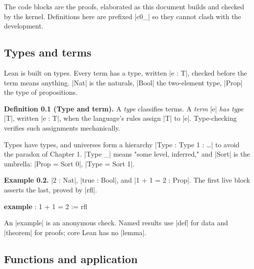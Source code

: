 \documentclass{memoir}
\begin{document}
The code blocks are the proofs, elaborated as this document builds and checked
by the kernel. Definitions here are prefixed \LeanVerb|c0_| so they cannot clash with the
development.



\subsection{Types and terms}\label{Two--Schemas--of--Impossibility-005F-005F-005F--Machine--Checked--Limits--of--Trustworthy--Machine--Learning-005F-005F-005F--and--Why--They--Tighten--with--Capability----Preliminaries----How--to--read--the--Lean--4----Types--and--terms}

Lean is built on types. Every term has a type, written \LeanVerb|e : T|, checked before
the term means anything. \LeanVerb|Nat| is the naturals, \LeanVerb|Bool| the two-element type,
\LeanVerb|Prop| the type of propositions.

\textbf{Definition 0.1 (Type and term).} A \emph{type} classifies terms. A \emph{term} \LeanVerb|e| \emph{has
type} \LeanVerb|T|, written \LeanVerb|e : T|, when the language's rules assign \LeanVerb|T| to \LeanVerb|e|.
Type-checking verifies such assignments mechanically.

Types have types, and universes form a hierarchy \LeanVerb|Type : Type 1 : …| to avoid
the paradox of Chapter 1. \LeanVerb|Type _| means "some level, inferred," and \LeanVerb|Sort| is
the umbrella: \LeanVerb|Prop = Sort 0|, \LeanVerb|Type = Sort 1|.

\textbf{Example 0.2.} \LeanVerb|2 : Nat|, \LeanVerb|true : Bool|, and \LeanVerb|1 + 1 = 2 : Prop|. The first live
block asserts the last, proved by \LeanVerb|rfl|.

\begin{LeanVerbatim}
\textbf{example} : 1 + 1 = 2 := rfl

\end{LeanVerbatim}


An \LeanVerb|example| is an anonymous check. Named results use \LeanVerb|def| for data and
\LeanVerb|theorem| for proofs; core Lean has no \LeanVerb|lemma|.



\subsection{Functions and application}\label{Two--Schemas--of--Impossibility-005F-005F-005F--Machine--Checked--Limits--of--Trustworthy--Machine--Learning-005F-005F-005F--and--Why--They--Tighten--with--Capability----Preliminaries----How--to--read--the--Lean--4----Functions--and--application}
\end{document}
